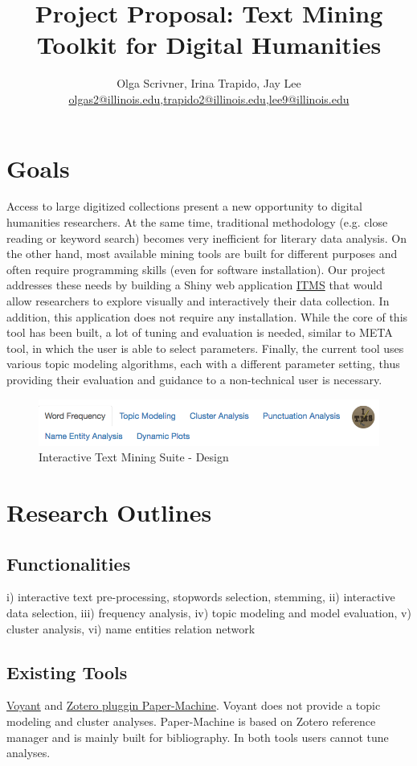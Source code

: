 \documentclass[11pt,a4paper]{amsart}
\title{Project Proposal: Text Mining Toolkit for Digital Humanities}
\author{Olga Scrivner, Irina Trapido, Jay Lee\\
\url{olgas2@illinois.edu},\url{trapido2@illinois.edu},\url{lee9@illinois.edu}}
\date{} %
\begin{document}
\maketitle
\thispagestyle{empty}
\section{Goals}
Access to large digitized collections present a new opportunity to digital humanities researchers. At the same time, traditional methodology (e.g. close reading or keyword search) becomes very inefficient for literary data analysis. On the other hand, most available mining tools are built for different purposes and often require programming skills (even for software installation). Our project addresses these needs by building a Shiny web application \href{https://languagevariationsuite.shinyapps.io/TextMining/}{ITMS} that would allow researchers to explore visually  and interactively their data collection. In addition, this application does not require any installation. While the core of this tool has been built, a lot of tuning and evaluation is needed, similar to META tool, in which  the user is able to select parameters. Finally, the current tool uses various topic modeling algorithms, each with a different parameter setting, thus providing their evaluation and guidance to a non-technical user is necessary.
\begin{figure}[H]
\includegraphics[width=4.7in]{itms.png}
\caption{Interactive Text Mining Suite - Design}
\end{figure}
\section{Research Outlines}
\subsection{Functionalities} i) interactive text pre-processing, stopwords selection, stemming, ii) interactive data selection, iii) frequency analysis, iv) topic modeling and model evaluation, v) cluster analysis, vi) name entities relation network
\subsection{Existing Tools} \href{https://voyant-tools.org/}{Voyant}  and \href{http://papermachines.org/}{Zotero pluggin Paper-Machine}. Voyant does not provide a topic modeling and cluster analyses. Paper-Machine is based on Zotero reference manager and is mainly built for bibliography. In both tools users cannot tune analyses.
\end{document}
